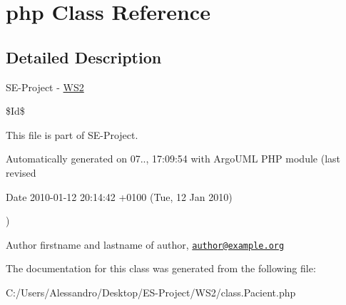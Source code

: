 \hypertarget{class_1_1_pacient_1_1php}{\section{php Class Reference}
\label{class_1_1_pacient_1_1php}
}


\subsection{Detailed Description}
S\+E-\/\+Project -\/ \hyperlink{namespace_w_s2}{W\+S2}

\$\+Id\$

This file is part of S\+E-\/\+Project.

Automatically generated on 07.., 17\+:09\+:54 with Argo\+U\+M\+L P\+H\+P module (last revised \begin{DoxyParagraph}{Date}
2010-\/01-\/12 20\+:14\+:42 +0100 (Tue, 12 Jan 2010) 
\end{DoxyParagraph}
)

\begin{DoxyAuthor}{Author}
firstname and lastname of author, \href{mailto:author@example.org}{\tt author@example.\+org} 
\end{DoxyAuthor}


The documentation for this class was generated from the following file\+:\begin{DoxyCompactItemize}
\item 
C\+:/\+Users/\+Alessandro/\+Desktop/\+E\+S-\/\+Project/\+W\+S2/class.\+Pacient.\+php\end{DoxyCompactItemize}
